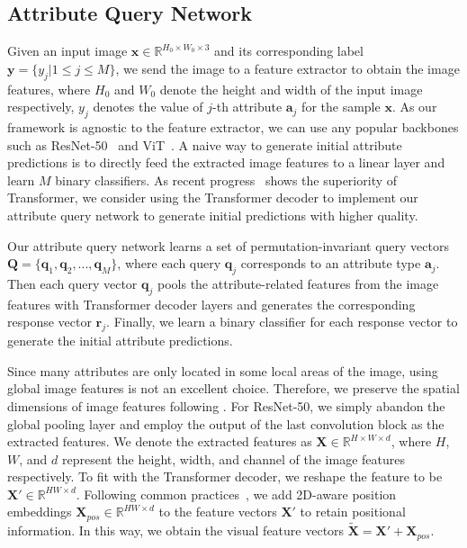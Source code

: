 \documentclass[runningheads]{llncs}
\begin{document}
\subsection{Attribute Query Network}

Given an input image $\bm{x} \in \mathbb{R}^{H_0 \times W_0 \times 3}$ and its corresponding label $\bm{y} =\{y_j| 1\le j \le M\}$, we send the image to a feature extractor to obtain the image features, where $H_0$ and $W_0$ denote the height and width of the input image respectively, $y_{j}$ denotes the value of $j$-th attribute $\bm{a}_j$ for the sample $\bm{x}$. As our framework is agnostic to the feature extractor, we can use any popular backbones such as  ResNet-50~\cite{he2016deep} and ViT~\cite{dosovitskiy2020image}.  A naive way to generate initial attribute predictions is to directly feed the extracted image features to a linear layer and learn $M$ binary classifiers. As recent progress~\cite{zhang2021temporal,doersch2020crosstransformers,lanchantin2021general,liu2021query2label} shows the superiority of Transformer, we consider using the Transformer decoder to implement our attribute query network to generate initial predictions with higher quality.

Our attribute query network learns a set of permutation-invariant  query vectors $\bm{Q} = \{\bm{q}_1, \bm{q}_2, ..., \bm{q}_M \}$, where each query $\bm{q}_j$ corresponds to an attribute type $\bm{a}_j$. Then each query vector $\bm{q}_j$ pools the attribute-related features from the image features with Transformer decoder layers and generates the corresponding response vector $\bm{r}_j$. Finally, we learn a binary classifier for each response vector to generate the initial attribute predictions.


Since many attributes are only located in some local areas of the image, using global image features is not an excellent choice. Therefore, we preserve the spatial dimensions of image features following \cite{liu2021query2label}. For ResNet-50, we simply abandon the global pooling layer and employ the output of the last convolution block as the extracted features. We denote the extracted features as $\bm{X} \in \mathbb{R}^{H \times W \times d}$, where $H$, $W$, and $d$ represent the height, width, and channel of the image features respectively. To fit with the Transformer decoder, we reshape the feature to be $\bm{X}' \in \mathbb{R}^{HW \times d}$. Following common practices~\cite{carion2020end,dosovitskiy2020image}, we add 2D-aware position embeddings $\bm{X}_{pos} \in \mathbb{R}^{HW \times d}$ to the feature vectors $\bm{X}'$ to retain positional information. In this way, we obtain the visual feature vectors $\bm{\widetilde{X}} = \bm{X}' + \bm{X}_{pos}$.
\end{document}
